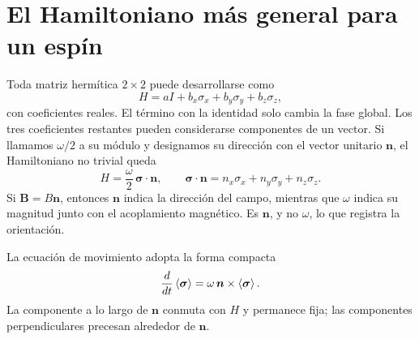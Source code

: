 \section{El Hamiltoniano más general para un espín}

Toda matriz hermítica \(2\times2\) puede desarrollarse como
\begin{equation}
H=aI+b_x\sigma_x+b_y\sigma_y+b_z\sigma_z,
\end{equation}
con coeficientes reales. El término con la identidad solo cambia la fase global. Los tres coeficientes restantes pueden considerarse componentes de un vector. Si llamamos \(\omega/2\) a su módulo y designamos su dirección con el vector unitario \(\bm n\), el Hamiltoniano no trivial queda
\begin{equation}
H=\frac{\omega}{2}\,\bm\sigma\cdot\bm n,
\qquad
\bm\sigma\cdot\bm n
=n_x\sigma_x+n_y\sigma_y+n_z\sigma_z.
\label{eq:l5-general-spin-h}
\end{equation}
Si \(\bm B=B\bm n\), entonces \(\bm n\) indica la dirección del campo, mientras que \(\omega\) indica su magnitud junto con el acoplamiento magnético. Es \(\bm n\), y no \(\omega\), lo que registra la orientación.

La ecuación de movimiento adopta la forma compacta
\begin{equation}
\frac{d}{dt}\left\langle\bm\sigma\right\rangle
=\omega\,\bm n\times\left\langle\bm\sigma\right\rangle.
\end{equation}
La componente a lo largo de \(\bm n\) conmuta con \(H\) y permanece fija; las componentes perpendiculares precesan alrededor de \(\bm n\).

\begin{classroomqa}\end{classroomqa}

\begin{classroomqa}\end{classroomqa}

